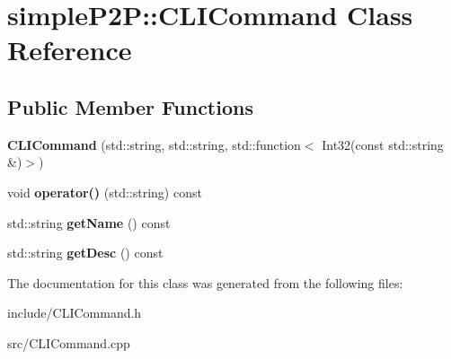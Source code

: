 \hypertarget{classsimpleP2P_1_1CLICommand}{}\section{simple\+P2P\+:\+:C\+L\+I\+Command Class Reference}
\label{classsimpleP2P_1_1CLICommand}
\subsection*{Public Member Functions}
\begin{DoxyCompactItemize}
\item 
\mbox{\label{classsimpleP2P_1_1CLICommand_a9d983edd720847832774517bb2d74b76}} 
{\bfseries C\+L\+I\+Command} (std\+::string, std\+::string, std\+::function$<$ Int32(const std\+::string \&)$>$)
\item 
\mbox{\label{classsimpleP2P_1_1CLICommand_a664d1534687bb9d11f0d613bca6febd5}} 
void {\bfseries operator()} (std\+::string) const
\item 
\mbox{\label{classsimpleP2P_1_1CLICommand_adad7522128a241e41725e161a63726c6}} 
std\+::string {\bfseries get\+Name} () const
\item 
\mbox{\label{classsimpleP2P_1_1CLICommand_a87f9a294e43f062b23639f40b0e5a518}} 
std\+::string {\bfseries get\+Desc} () const
\end{DoxyCompactItemize}


The documentation for this class was generated from the following files\+:\begin{DoxyCompactItemize}
\item 
include/C\+L\+I\+Command.\+h\item 
src/C\+L\+I\+Command.\+cpp\end{DoxyCompactItemize}
